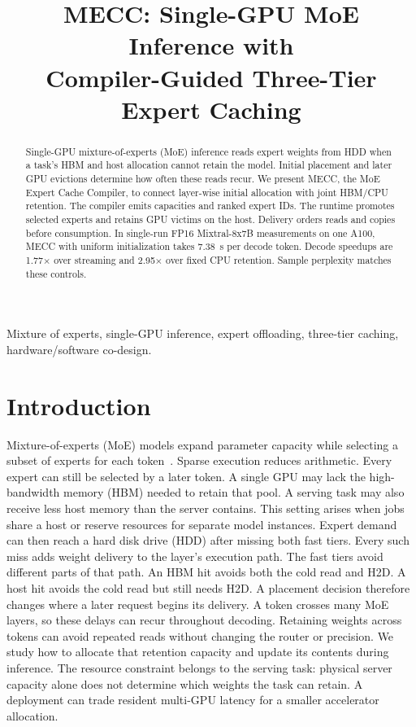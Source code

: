 \documentclass[conference,9pt,letterpaper]{IEEEtran}
\title{MECC: Single-GPU MoE Inference with\protect\\Compiler-Guided Three-Tier Expert Caching}
\author{}
\begin{document}
\maketitle\raggedbottom
\begin{abstract}
Single-GPU mixture-of-experts (MoE) inference reads expert weights from HDD when a task's HBM and host allocation cannot retain the model. Initial placement and later GPU evictions determine how often these reads recur. We present MECC, the MoE Expert Cache Compiler, to connect layer-wise initial allocation with joint HBM/CPU retention. The compiler emits capacities and ranked expert IDs. The runtime promotes selected experts and retains GPU victims on the host. Delivery orders reads and copies before consumption. In single-run FP16 Mixtral-8x7B measurements on one A100, MECC with uniform initialization takes 7.38~s per decode token. Decode speedups are 1.77$\times$ over streaming and 2.95$\times$ over fixed CPU retention. Sample perplexity matches these controls.
\end{abstract}

\begin{IEEEkeywords}
Mixture of experts, single-GPU inference, expert offloading, three-tier caching, hardware/software co-design.
\end{IEEEkeywords}

\section{Introduction}
Mixture-of-experts (MoE) models expand parameter capacity while selecting a subset of experts for each token~\cite{shazeer,switch,mixtral,deepseekmoe}. Sparse execution reduces arithmetic. Every expert can still be selected by a later token. A single GPU may lack the high-bandwidth memory (HBM) needed to retain that pool. A serving task may also receive less host memory than the server contains. This setting arises when jobs share a host or reserve resources for separate model instances. Expert demand can then reach a hard disk drive (HDD) after missing both fast tiers. Every such miss adds weight delivery to the layer's execution path. The fast tiers avoid different parts of that path. An HBM hit avoids both the cold read and H2D. A host hit avoids the cold read but still needs H2D. A placement decision therefore changes where a later request begins its delivery. A token crosses many MoE layers, so these delays can recur throughout decoding. Retaining weights across tokens can avoid repeated reads without changing the router or precision. We study how to allocate that retention capacity and update its contents during inference. The resource constraint belongs to the serving task: physical server capacity alone does not determine which weights the task can retain. A deployment can trade resident multi-GPU latency for a smaller accelerator allocation.
\end{document}
